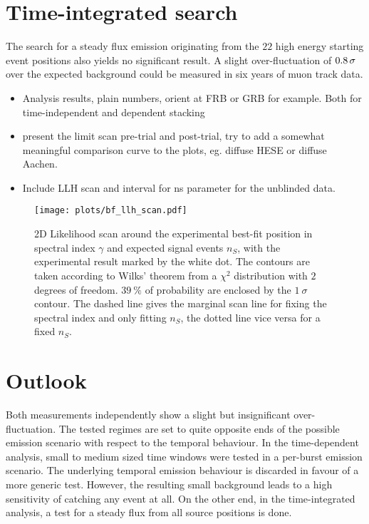 \section*{Time-integrated search}
The search for a steady flux emission originating from the $\num{22}$ high energy starting event positions also yields no significant result.
A slight over-fluctuation of $\num{0.8}\,\sigma$ over the expected background could be measured in six years of muon track data.


\begin{itemize}
  \item Analysis results, plain numbers, orient at FRB or GRB for example.
  Both for time-independent and dependent stacking
  \item present the limit scan pre-trial and post-trial, try to add a somewhat meaningful comparison curve to the plots, eg. diffuse HESE or diffuse Aachen.
  \item Include LLH scan and interval for ns parameter for the unblinded data.
\end{itemize}

\begin{figure}[htbp]
  \centering
  \texttt{[image: plots/bf\_llh\_scan.pdf]}
  \caption[2D LLH scan of $n_S$ and $\gamma$ for the time integrated search.]{
    2D Likelihood scan around the experimental best-fit position in spectral index $\gamma$ and expected signal events $n_S$, with the experimental result marked by the white dot.
    The contours are taken according to Wilks' theorem from a $\chi^2$ distribution with $\num{2}$ degrees of freedom.
    $\SI{39}{\percent}$ of probability are enclosed by the $\SI{1}{\sigma}$ contour.
    The dashed line gives the marginal scan line for fixing the spectral index and only fitting $n_S$, the dotted line vice versa for a fixed $n_S$.}
\end{figure}



\section{Outlook}
Both measurements independently show a slight but insignificant over-fluctuation.
The tested regimes are set to quite opposite ends of the possible emission scenario with respect to the temporal behaviour.
In the time-dependent analysis, small to medium sized time windows were tested in a per-burst emission scenario.
The underlying temporal emission behaviour is discarded in favour of a more generic test.
However, the resulting small background leads to a high sensitivity of catching any event at all.
On the other end, in the time-integrated analysis, a test for a steady flux from all source positions is done.


